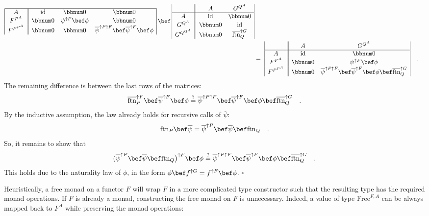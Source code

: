 \begin{align*}
\begin{array}{|c||ccc|}
\hline A & \text{id} & \bbnum 0 & \bbnum 0\\
F^{P^{A}} & \bbnum 0 & \psi^{\uparrow F}\bef\phi & \bbnum 0\\
F^{P^{P^{A}}} & \bbnum 0 & \bbnum 0 & \overline{\psi}^{\uparrow P\uparrow F}\bef\overline{\psi}^{\uparrow F}\bef\phi
\end{array}\,\bef\,\begin{array}{|c||cc|}
 & A & G^{Q^{A}}\\
\hline A & \text{id} & \bbnum 0\\
G^{Q^{A}} & \bbnum 0 & \text{id}\\
G^{Q^{Q^{A}}} & \bbnum 0 & \overline{\text{ftn}}_{Q}^{\uparrow G}
\end{array}\\
 & =\,\,\begin{array}{|c||cc|}
 & A & G^{Q^{A}}\\
\hline A & \text{id} & \bbnum 0\\
F^{P^{A}} & \bbnum 0 & \psi^{\uparrow F}\bef\phi\\
F^{P^{P^{A}}} & \bbnum 0 & \overline{\psi}^{\uparrow P\uparrow F}\bef\overline{\psi}^{\uparrow F}\bef\phi\bef\overline{\text{ftn}}_{Q}^{\uparrow G}
\end{array}\quad.
\end{align*}
The remaining difference is between the last rows of the matrices:
\[
\overline{\text{ftn}}_{P}^{\uparrow F}\bef\overline{\psi}^{\uparrow F}\bef\phi\overset{?}{=}\overline{\psi}^{\uparrow P\uparrow F}\bef\overline{\psi}^{\uparrow F}\bef\phi\bef\overline{\text{ftn}}_{Q}^{\uparrow G}\quad.
\]
By the inductive assumption, the law already holds for recursive calls
of $\overline{\psi}$:
\[
\text{ftn}_{P}\bef\overline{\psi}=\overline{\psi}^{\uparrow P}\bef\overline{\psi}\bef\text{ftn}_{Q}\quad.
\]
So, it remains to show that
\[
(\overline{\psi}^{\uparrow P}\bef\overline{\psi}\bef\text{ftn}_{Q}\big)^{\uparrow F}\bef\phi\overset{?}{=}\overline{\psi}^{\uparrow P\uparrow F}\bef\overline{\psi}^{\uparrow F}\bef\phi\bef\overline{\text{ftn}}_{Q}^{\uparrow G}\quad.
\]
This holds due to the naturality law of $\phi$, in the form $\phi\bef f^{\uparrow G}=f^{\uparrow F}\bef\phi$.
$\square$

Heuristically, a free monad on a functor $F$ will wrap $F$ in a
more complicated type constructor such that the resulting type has
the required monad operations. If $F$ is already a monad, constructing
the free monad on $F$ is unnecessary. Indeed, a value of type $\text{Free}^{F,A}$
can be always mapped back to $F^{A}$ while preserving the monad operations:

